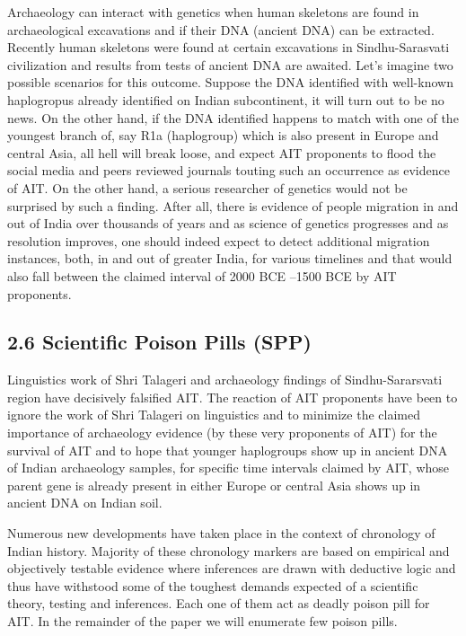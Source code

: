 Archaeology can interact with genetics when human skeletons are found in archaeological excavations and if their DNA (ancient DNA) can be extracted. Recently human skeletons were found at certain excavations in Sindhu-Sarasvati civilization and results from tests of ancient DNA are awaited. Let’s imagine two possible scenarios for this outcome. Suppose the DNA identified with well-known haplogropus already identified on Indian subcontinent, it will turn out to be no news. On the other hand, if the DNA identified happens to match with one of the youngest branch of, say R1a (haplogroup) which is also present in Europe and central Asia, all hell will break loose, and expect AIT proponents to flood the social media and peers reviewed journals touting such an occurrence as evidence of AIT. On the other hand, a serious researcher of genetics would not be surprised by such a finding. After all, there is evidence of people migration in and out of India over thousands of years and as science of genetics progresses and as resolution improves, one should indeed expect to detect additional migration instances, both, in and out of greater India, for various timelines and that would also fall between the claimed interval of 2000 BCE –1500 BCE by AIT proponents.


\subsection*{2.6 Scientific Poison Pills (SPP)}

Linguistics work of Shri Talageri and archaeology findings of Sindhu-Sararsvati region have decisively falsified AIT. The reaction of AIT proponents have been to ignore the work of Shri Talageri on linguistics and to minimize the claimed importance of archaeology evidence (by these very proponents of AIT) for the survival of AIT and to hope that younger haplogroups show up in ancient DNA of Indian archaeology samples, for specific time intervals claimed by AIT, whose parent gene is already present in either Europe or central Asia shows up in ancient DNA on Indian soil.

Numerous new developments have taken place in the context of chronology of Indian history. Majority of these chronology markers are based on empirical and objectively testable evidence where inferences are drawn with deductive logic and thus have withstood some of the toughest demands expected of a scientific theory, testing and inferences. Each one of them act as deadly poison pill for AIT. In the remainder of the paper we will enumerate few poison pills.


